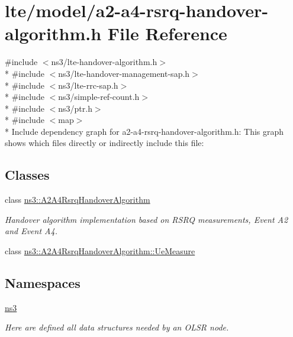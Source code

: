 \hypertarget{a2-a4-rsrq-handover-algorithm_8h}{}\section{lte/model/a2-\/a4-\/rsrq-\/handover-\/algorithm.h File Reference}
\label{a2-a4-rsrq-handover-algorithm_8h}
{\ttfamily \#include $<$ns3/lte-\/handover-\/algorithm.\+h$>$}\\*
{\ttfamily \#include $<$ns3/lte-\/handover-\/management-\/sap.\+h$>$}\\*
{\ttfamily \#include $<$ns3/lte-\/rrc-\/sap.\+h$>$}\\*
{\ttfamily \#include $<$ns3/simple-\/ref-\/count.\+h$>$}\\*
{\ttfamily \#include $<$ns3/ptr.\+h$>$}\\*
{\ttfamily \#include $<$map$>$}\\*
Include dependency graph for a2-\/a4-\/rsrq-\/handover-\/algorithm.h\+:
This graph shows which files directly or indirectly include this file\+:
\subsection*{Classes}
\begin{DoxyCompactItemize}
\item 
class \hyperlink{classns3_1_1A2A4RsrqHandoverAlgorithm}{ns3\+::\+A2\+A4\+Rsrq\+Handover\+Algorithm}
\begin{DoxyCompactList}\small\item\em Handover algorithm implementation based on R\+S\+RQ measurements, Event A2 and Event A4. \end{DoxyCompactList}\item 
class \hyperlink{classns3_1_1A2A4RsrqHandoverAlgorithm_1_1UeMeasure}{ns3\+::\+A2\+A4\+Rsrq\+Handover\+Algorithm\+::\+Ue\+Measure}
\end{DoxyCompactItemize}
\subsection*{Namespaces}
\begin{DoxyCompactItemize}
\item 
 \hyperlink{namespacens3}{ns3}
\begin{DoxyCompactList}\small\item\em Here are defined all data structures needed by an O\+L\+SR node. \end{DoxyCompactList}\end{DoxyCompactItemize}
